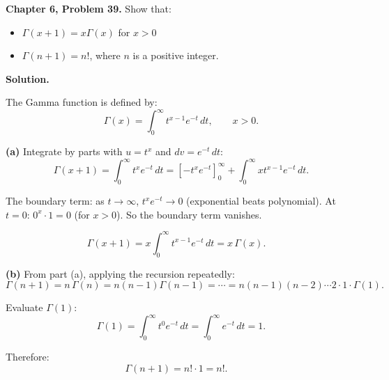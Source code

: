 \documentclass[12pt]{article}
\begin{document}
\textbf{Chapter 6, Problem 39.} Show that:
\begin{itemize}
\item[(a)] $\Gamma(x+1) = x\Gamma(x)$ for $x > 0$
\item[(b)] $\Gamma(n+1) = n!$, where $n$ is a positive integer.
\end{itemize}

\bigskip
\textbf{Solution.}

The Gamma function is defined by:
\[
\Gamma(x) = \int_0^{\infty}t^{x-1}e^{-t}\,dt, \qquad x > 0.
\]

\textbf{(a)} Integrate by parts with $u = t^x$ and $dv = e^{-t}\,dt$:
\[
\Gamma(x+1) = \int_0^{\infty}t^{x}e^{-t}\,dt = \left[-t^x e^{-t}\right]_0^{\infty} + \int_0^{\infty}xt^{x-1}e^{-t}\,dt.
\]

The boundary term: as $t \to \infty$, $t^x e^{-t} \to 0$ (exponential beats polynomial). At $t = 0$: $0^x \cdot 1 = 0$ (for $x > 0$). So the boundary term vanishes.

\[
\Gamma(x+1) = x\int_0^{\infty}t^{x-1}e^{-t}\,dt = x\,\Gamma(x). \quad
\]

\textbf{(b)} From part (a), applying the recursion repeatedly:
\[
\Gamma(n+1) = n\,\Gamma(n) = n(n-1)\Gamma(n-1) = \cdots = n(n-1)(n-2)\cdots 2 \cdot 1 \cdot \Gamma(1).
\]

Evaluate $\Gamma(1)$:
\[
\Gamma(1) = \int_0^{\infty}t^{0}e^{-t}\,dt = \int_0^{\infty}e^{-t}\,dt = 1.
\]

Therefore:
\[
\Gamma(n+1) = n! \cdot 1 = n!. \quad
\]
\end{document}
